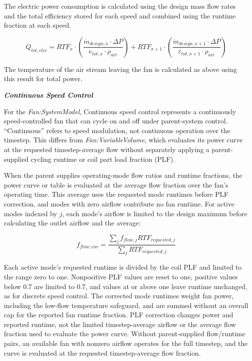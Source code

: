 The electric power consumption is calculated using the design mass flow rates and the total efficiency stored for each speed and combined using the runtime fraction at each speed.

\begin{equation}
{\dot Q_{tot,elec}} = {RTF_{x}} \cdot \left( \frac{\dot m_{design,x}\cdot \Delta P}{{e_{tot,x}}\cdot {\rho_{air}}}\right)  +  {RTF_{x+1}} \cdot \left( \frac{\dot m_{design,x+1}\cdot \Delta P}{{\varepsilon_{tot,x+1}}\cdot {\rho_{air}}}\right)
\end{equation}

The temperature of the air stream leaving the fan is calculated as above using this result for total power.

\emph{\textbf{Continuous Speed Control}}

For the \emph{Fan:SystemModel}, Continuous speed control represents a continuously speed-controlled fan that can cycle on and off under parent-system control. ``Continuous'' refers to speed modulation, not continuous operation over the timestep. This differs from \emph{Fan:VariableVolume}, which evaluates its power curve at the requested timestep-average flow without separately applying a parent-supplied cycling runtime or coil part load fraction (PLF).

When the parent supplies operating-mode flow ratios and runtime fractions, the power curve or table is evaluated at the average flow fraction over the fan's operating time. This average uses the requested mode runtimes before PLF correction, and modes with zero airflow contribute no fan runtime. For active modes indexed by \(j\), each mode's airflow is limited to the design maximum before calculating the outlet airflow and the average:

\begin{equation}
{f_{flow,cur}} = \frac{\sum_j {f_{flow,j}} {RTF_{requested,j}}}{\sum_j {RTF_{requested,j}}}
\end{equation}

Each active mode's requested runtime is divided by the coil PLF and limited to the range zero to one. Nonpositive PLF values are reset to one, positive values below 0.7 are limited to 0.7, and values at or above one leave runtime unchanged, as for discrete speed control. The corrected mode runtimes weight fan power, including the low-flow temperature safeguard, and are summed without an overall cap for the reported fan runtime fraction. PLF correction changes power and reported runtime, not the limited timestep-average airflow or the average flow fraction used to evaluate the power curve. Without parent-supplied flow/runtime pairs, an available fan with nonzero airflow operates for the full timestep, and the curve is evaluated at the requested timestep-average flow fraction.

